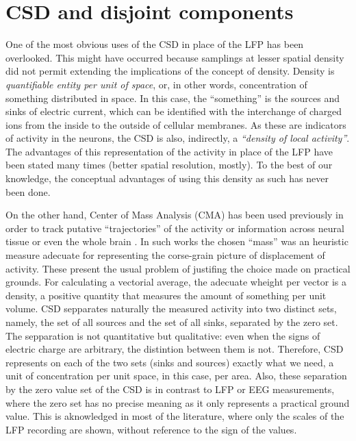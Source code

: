 \documentclass{article}
\begin{document}
\section{CSD and disjoint components}

One of the most obvious uses of the CSD in place of the LFP has been overlooked. This might have occurred because  samplings at lesser spatial density did not permit extending the implications of the concept of density. Density is \emph{quantifiable entity per unit of space}, or, in other words, concentration of something distributed in space. In this case, the ``something'' is the sources and sinks of electric current, which can be identified with the interchange of charged ions from the inside to the outside of cellular membranes. As these are indicators of activity in the neurons, the CSD is also, indirectly, a \emph{``density of local activity''}. The advantages of this representation of the activity in place of the LFP have been stated many times (better spatial resolution, mostly). To the best of our knowledge, the conceptual advantages of using this density as such has never been done. 

On the other hand, Center of Mass Analysis (CMA) has been used previously in order to track putative  ``trajectories'' of the activity or information across neural tissue or even the whole brain \cite{Chao05, Chao07, Manjarrez07, Manjarrez09}. In such works the chosen ``mass'' was an heuristic measure adecuate for representing the corse-grain picture of displacement of activity. These present the usual problem of justifing the choice made on practical grounds. For calculating a vectorial average, the adecuate wheight per vector is a density, a positive quantity that measures the amount of something per unit volume. CSD sepparates naturally the measured activity into two distinct sets, namely, the set of all sources and the set of all sinks, separated by the zero set. The sepparation is not quantitative but qualitative: even when the signs of electric charge are arbitrary, the distintion between them is not. Therefore, CSD represents on each of the two sets (sinks and sources) exactly what we need, a unit of concentration per unit space, in this case, per area.  Also, these separation by the zero value set of the CSD is in contrast to LFP or EEG measurements, where the zero set has no precise meaning as it only represents a practical ground value. This is aknowledged in most of the literature, where only the scales of the LFP recording are shown, without reference to the sign of the values.  
\end{document}
